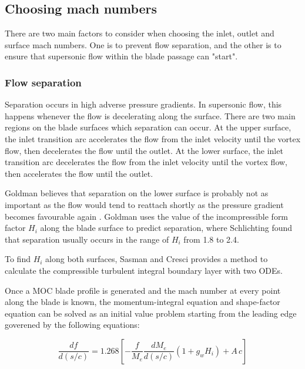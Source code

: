 
\subsection{Choosing mach numbers}

There are two main factors to consider when choosing the inlet, outlet and surface mach numbers. One is to prevent flow separation, and the other is to ensure that supersonic flow within the blade passage can "start".

\subsubsection{Flow separation}

Separation occurs in high adverse pressure gradients. In supersonic flow, this happens whenever the flow is decelerating along the surface.  There are two main regions on the blade surfaces which separation can occur. At the upper surface, the inlet transition arc accelerates the flow from the inlet velocity until the vortex flow, then decelerates the flow until the outlet. At the lower surface, the inlet transition arc decelerates the flow from the inlet velocity until the vortex flow, then accelerates the flow until the outlet. 


Goldman believes that separation on the lower surface is probably not as important as the flow would tend to reattach shortly as the pressure gradient becomes favourable again \cite{goldman1970}. Goldman uses the value of the incompressible form factor $H_i$ along the blade surface to predict separation, where  Schlichting found  that separation usually occurs in the range of $H_i$ from 1.8 to 2.4.

To find $H_i$ along both surfaces, Sasman and Cresci \cite{sasmancresci} provides a method to calculate the compressible turbulent integral boundary layer with two ODEs. 

Once a MOC blade profile is generated and the mach number at every point along the blade is known, the momentum-integral equation and shape-factor equation can be solved as an initial value problem starting from the leading edge goverened by the following equations:

\begin{equation}
    \frac{df}{d(s/c)} = 1.268\left[-\frac{f}{M_e}\frac{dM_e}{d(s/c)}\left(1 + g_w H_i\right) + A\,c\right]
\end{equation}

